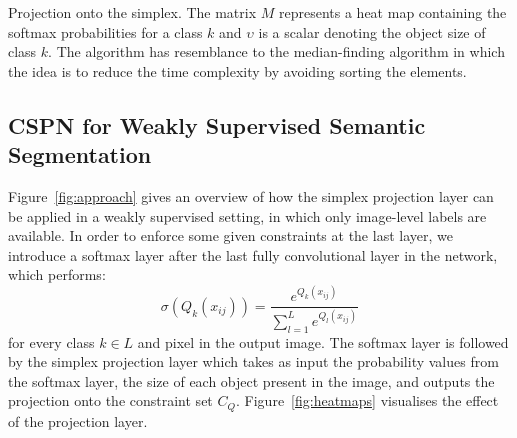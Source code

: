 \documentclass{bmvc2k}
\newcommand{\R}{\mathbb{R}}
\begin{document}
	
		\begin{algorithm}[t]
		\KwInput{A matrix $M\in \R^{m\times n}$ and a scalar $\upsilon$ > 0 }
		\caption{Projection onto the simplex. The matrix $M$ represents a heat map containing the softmax probabilities for a class $k$ and $\upsilon$ is a scalar denoting the object size of class $k$. The algorithm has resemblance to the median-finding algorithm in which the idea is to reduce the time complexity by avoiding sorting the elements.}
		\label{alg:simplexprojection}
	\end{algorithm} 

\subsection{CSPN for Weakly Supervised Semantic Segmentation}\label{sec:CSPN}

Figure~\ref{fig:approach} gives an overview of how the simplex projection layer can be applied in a weakly supervised setting, in which only image-level labels are available. In order to enforce some given constraints at the last layer, we introduce a softmax layer after the last fully convolutional layer in the network, which performs:
		\begin{equation}
		\sigma(Q_k(x_{ij})) = \frac{e^{Q_k(x_{ij})}}{\sum_{l=1}^{L}e^{Q_l(x_{ij})}}
		\end{equation}
	for every class $k\in L$ and pixel in the output image.
	The softmax layer is followed by the simplex projection layer which takes as input the probability values from the softmax layer, the size of each object present in the image, and outputs the projection onto the constraint set $C_Q$. Figure~\ref{fig:heatmaps} visualises the effect of the projection layer.   
	
\end{document}
